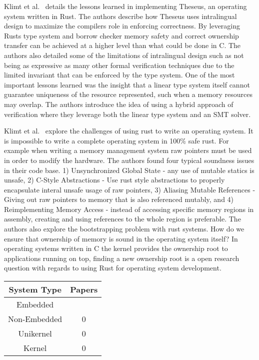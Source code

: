 \documentclass[sigconf]{acmart}
\begin{document}
Klimt et al.~\cite{Klimt2023-ob} details the lessons learned in implementing Theseus, an operating
system written in Rust. The authors describe how Theseus uses intralingual design to maximize the
compilers role in enforcing correctness. By leveraging Rusts type system and borrow checker memory
safety and correct ownership transfer can be achieved at a higher level than what could be done in
C. The authors also detailed some of the limitations of intralingual design such as not being as
expressive as many other formal verification techniques due to the limited invariant that can be
enforced by the type system. One of the most important lessons learned was the insight that a linear
type system itself cannot guarantee uniqueness of the resource represented, such when a memory
resources may overlap. The authors introduce the idea of using a hybrid approach of verification
where they leverage both the linear type system and an SMT solver.

Klimt et al.~\cite{Klimt2023-ob} explore the challenges of using rust to write an operating
system. It is impossible to write a complete operating system in 100\% safe rust. For example when
writing a memory management system raw pointers must be used in order to modify the hardware. The
authors found four typical soundness issues in their code base. 1) Unsynchronized Global State - any
use of mutable statics is unsafe, 2) C-Style Abstractions - Use rust style abstractions to properly
encapsulate interal unsafe usage of raw pointers, 3) Aliasing Mutable References - Giving out raw
pointers to memory that is also referenced mutably, and 4) Reimplementing Memory Access - instead of
accessing specific memory regions in assembly, creating and using references to the whole region is
preferable. The authors also explore the bootstrapping problem with rust systems. How do we ensure
that ownership of memory is sound in the operating system itself? In operating systems written in C
the kernel provides the ownership root to applications running on top, finding a new ownership root
is a open research question with regards to using Rust for operating system development.


\begin{table}
  \begin{tabular}{||c|c||}
    \hline
    System Type & Papers\\
    \hline\hline
    Embedded & ~\cite{Ayers2022-vk} \\
    Non-Embedded & 0 \\
    Unikernel & 0 \\
    Kernel & 0 \\
    \hline
  \end{tabular}
\end{table}
\end{document}
